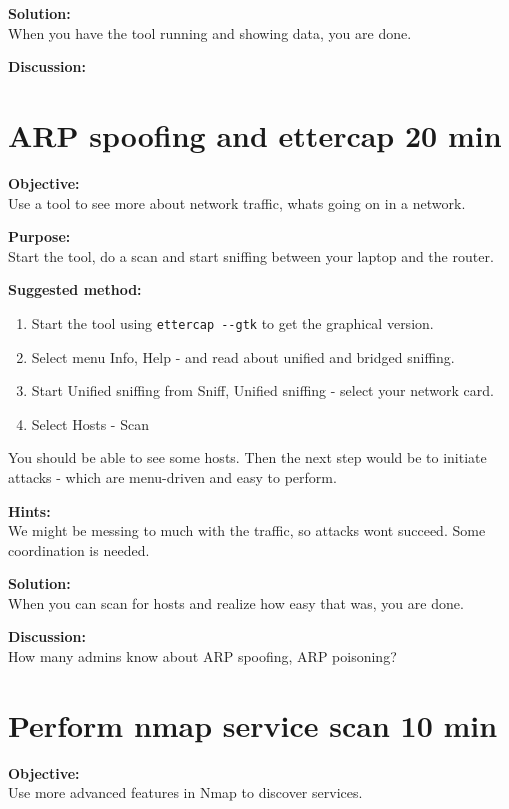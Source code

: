 \documentclass[a4paper,11pt,notitlepage]{report}
\begin{document}
{\bf Solution:}\\
When you have the tool running and showing data, you are done.

{\bf Discussion:}\\


\chapter{ARP spoofing and ettercap 20 min}
\label{ex:arp-spoof-ettercap}



{\bf Objective:}\\
Use a tool to see more about network traffic, whats going on in a network.

{\bf Purpose:}\\
Start the tool, do a scan and start sniffing between your laptop and the router.

{\bf Suggested method:}
\begin{enumerate}
\item Start the tool using \verb+ettercap --gtk+ to get the graphical version.
\item Select menu Info, Help - and read about unified and bridged sniffing.
\item Start Unified sniffing from Sniff, Unified sniffing - select your network card.
\item Select Hosts - Scan
\end{enumerate}

You should be able to see some hosts. Then the next step would be to initiate attacks - which are menu-driven and easy to perform.

{\bf Hints:}\\
We might be messing to much with the traffic, so attacks wont succeed. Some coordination is needed.

{\bf Solution:}\\
When you can scan for hosts and realize how easy that was, you are done.

{\bf Discussion:}\\
How many admins know about ARP spoofing, ARP poisoning?


\chapter{Perform nmap service scan 10 min}
\label{ex:nmap-service}

{\bf Objective:} \\
Use more advanced features in Nmap to discover services.
\end{document}
